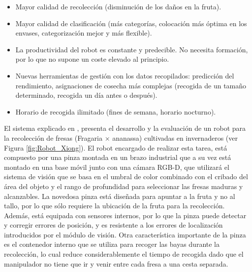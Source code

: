 \begin{itemize}
    \item Mayor calidad de recolección (disminución de los daños en la fruta).
    \item Mayor calidad de clasificación (más categorías, colocación más óptima 								en los envases, categorización mejor y más flexible).
    \item La productividad del robot es constante y predecible. No necesita formación, por lo que no supone un coste elevado al principio.
    \item Nuevas herramientas de gestión con los datos recopilados: predicción del rendimiento, asignaciones de cosecha más complejas (recogida de un tamaño
determinado, recogida un día antes o después).
    \item Horario de recogida ilimitado (fines de semana, horario nocturno).
\end{itemize}

El sistema explicado en \cite{Xiong19}, presenta el desarrollo y la evaluación de un robot para la recolección de fresas (Fragaria × ananassa) cultivadas en invernaderos (ver Figura \ref{fig:Robot_Xiong}). El robot encargado de realizar esta tarea, está compuesto por una pinza montada en un brazo industrial que a su vez está montado en una base móvil junto con una cámara RGB-D, que utilizará el sistema de visión que se basa en el umbral de color combinado con el cribado del área del objeto y el rango de profundidad para seleccionar las fresas maduras y alcanzables. La novedosa pinza está diseñada para apuntar a la fruta y no al tallo, por lo que sólo requiere la ubicación de la fruta para la recolección. Además, está equipada con sensores internos, por lo que la pinza puede detectar y corregir errores de posición, y es resistente a los errores de localización introducidos por el módulo de visión. Otra característica importante de la pinza es el contenedor interno que se utiliza para recoger las bayas durante la recolección, lo cual reduce considerablemente el tiempo de recogida dado que el manipulador no tiene que ir y venir entre cada fresa a una cesta separada.

